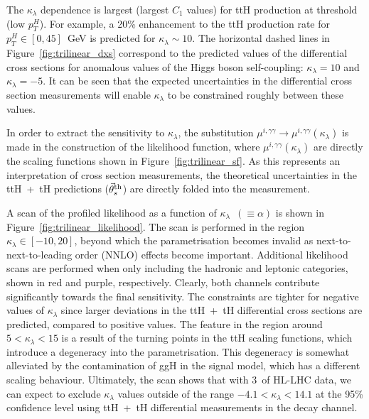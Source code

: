 The $\kappa_\lambda$ dependence is largest (largest $C_1$ values) for ttH production at threshold (low $p_T^H$). For example, a 20\% enhancement to the ttH production rate for $p_T^H\in[0,45]$~GeV is predicted for $\kappa_\lambda \sim 10$. The horizontal dashed lines in Figure~\ref{fig:trilinear_dxs} correspond to the predicted values of the differential cross sections for anomalous values of the Higgs boson self-coupling: $\kappa_\lambda=10$ and $\kappa_\lambda=-5$. It can be seen that the expected uncertainties in the differential cross section measurements will enable $\kappa_\lambda$ to be constrained roughly between these values.

In order to extract the sensitivity to $\kappa_\lambda$, the substitution $\mu^{i,\gamma\gamma}\rightarrow\mu^{i,\gamma\gamma}(\kappa_\lambda)$ is made in the construction of the likelihood function, where $\mu^{i,\gamma\gamma}(\kappa_\lambda)$ are directly the scaling functions shown in Figure~\ref{fig:trilinear_sf}. As this represents an interpretation of cross section measurements, the theoretical uncertainties in the ttH~+~tH predictions ($\vec{\theta}^{\rm{th}}_s$) are directly folded into the measurement.

A scan of the profiled likelihood as a function of $\kappa_\lambda$~$(\equiv\alpha)$ is shown in Figure~\ref{fig:trilinear_likelihood}. The scan is performed in the region $\kappa_\lambda \in [-10,20]$, beyond which the parametrisation becomes invalid as next-to-next-to-leading order (NNLO) effects become important. Additional likelihood scans are performed when only including the hadronic and leptonic categories, shown in red and purple, respectively. Clearly, both channels contribute significantly towards the final sensitivity. The constraints are tighter for negative values of $\kappa_\lambda$ since larger deviations in the ttH~+~tH differential cross sections are predicted, compared to positive values. The feature in the region around $5<\kappa_\lambda<15$ is a result of the turning points in the ttH scaling functions, which introduce a degeneracy into the parametrisation. This degeneracy is somewhat alleviated by the contamination of ggH in the signal model, which has a different scaling behaviour. Ultimately, the scan shows that with 3~\abinv of HL-LHC data, we can expect to exclude $\kappa_\lambda$ values outside of the range $-4.1<\kappa_\lambda<14.1$ at the 95\% confidence level using ttH~+~tH differential measurements in the \Hgg decay channel.

